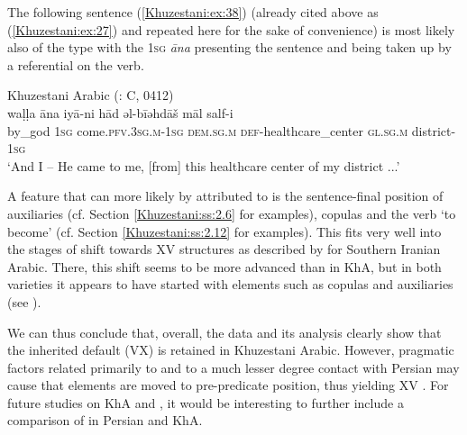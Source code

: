 \documentclass[output=paper,colorlinks,citecolor=brown,draftmode]{langscibook}
\begin{document}
The following sentence (\ref{Khuzestani:ex:38}) (already cited above as (\ref{Khuzestani:ex:27}) and repeated here for the sake of convenience) is most likely also of the  type with the \textsc{1sg}  \textit{āna} presenting the sentence  and being taken up by a referential  on the verb.

\ea\label{Khuzestani:ex:38}
Khuzestani Arabic (\citealt{leitnerArabic2021}: C, 0412) \\
\gll waḷḷa āna iyā-ni hād əl-bīəhdāš{\footnotemark} māl salf-i \\
by\_god \textsc{1sg} come\textsc{.pfv.3sg.m-1sg} \textsc{dem.sg.m} \textsc{def-}healthcare\_center \textsc{gl.sg.m} district\textsc{-1sg} \\
\glt `And I – He came to me, [from] this healthcare center of my district ...' 
\z


A feature that can more likely by attributed to  is the sentence-final position of auxiliaries (cf. Section \ref{Khuzestani:ss:2.6} for examples), copulas and the verb `to become' (cf. Section \ref{Khuzestani:ss:2.12} for examples). This fits very well into the stages of shift towards XV structures as described by \citet{ElZarkaZiagos2020WOCA} for Southern Iranian Arabic. There, this shift seems to be more advanced than in KhA, but in both varieties it appears to have started with elements such as copulas and auxiliaries (see \citealt{leitnerClause-final2022}). 

We can thus conclude that, overall, the data and its analysis clearly show that the inherited default  (VX) is retained in Khuzestani Arabic. However, pragmatic factors related primarily to  and to a much lesser degree contact with Persian may cause that elements are moved to pre-predicate position, thus yielding XV . For future studies on KhA  and , it would be interesting to further include a comparison of  in Persian and KhA.
\end{document}
